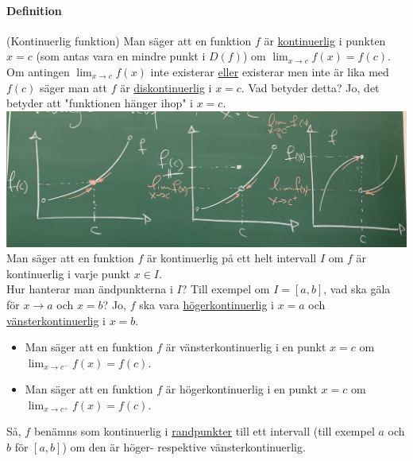\paragraph{Definition} (Kontinuerlig funktion)
Man säger att en funktion $f$ är \underline{kontinuerlig} i punkten $x=c$ (som antas vara en mindre punkt i $D(f)$) om $\lim_{x\to c}f(x)=f(c)$.
Om antingen $\lim_{x\to c}f(x)$ inte existerar \underline{eller} existerar men inte är lika med $f(c)$ säger man att $f$ är \underline{diskontinuerlig} i $x=c$.
Vad betyder detta? Jo, det betyder att "funktionen hänger ihop" i $x=c$.\\
\includegraphics[scale=0.1]{lessons/lesson04/imgs/img02.jpg}\\
Man säger att en funktion $f$ är kontinuerlig på ett helt intervall $I$ om $f$ är kontinuerlig i varje punkt $x\in I$.\\
Hur hanterar man ändpunkterna i $I$? Till exempel om $I=[a,b]$, vad ska gäla för $x\to a$ och $x=b$?
Jo, $f$ ska vara \underline{högerkontinuerlig} i $x=a$ och \underline{vänsterkontinuerlig} i $x=b$.
\begin{itemize}
    \item Man säger att en funktion $f$ är vänsterkontinuerlig i en punkt $x=c$ om $\lim_{x\to c^-}f(x)=f(c)$.
    \item Man säger att en funktion $f$ är högerkontinuerlig i en punkt $x=c$ om $\lim_{x\to c^+}f(x)=f(c)$.
\end{itemize}
Så, $f$ benämns som kontinuerlig i \underline{randpunkter} till ett intervall (till exempel $a$ och $b$ för $[a,b]$) om den är höger- respektive vänsterkontinuerlig.\\
